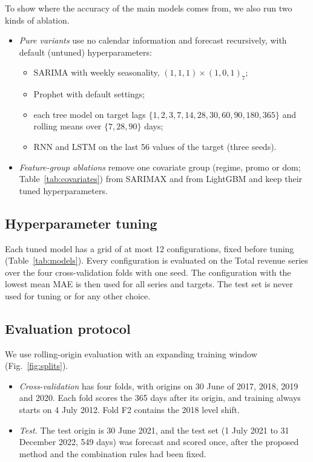 \documentclass[conference]{IEEEtran}
\begin{document}
To show where the accuracy of the main models comes from, we also run two kinds of ablation.
\begin{itemize}
\item \emph{Pure variants} use no calendar information and forecast recursively, with default (untuned) hyperparameters:
\begin{itemize}
\item SARIMA with weekly seasonality, $(1,1,1)\times(1,0,1)_7$;
\item Prophet with default settings;
\item each tree model on target lags $\{1,2,3,7,14,28,30,60,90,180,365\}$ and rolling means over $\{7,28,90\}$ days;
\item RNN and LSTM on the last 56 values of the target (three seeds).
\end{itemize}
\item \emph{Feature-group ablations} remove one covariate group (regime, promo or dom; Table~\ref{tab:covariates}) from SARIMAX and from LightGBM and keep their tuned hyperparameters.
\end{itemize}

\subsection{Hyperparameter tuning}
Each tuned model has a grid of at most 12 configurations, fixed before tuning (Table~\ref{tab:models}).
Every configuration is evaluated on the Total revenue series over the four cross-validation folds with one seed.
The configuration with the lowest mean MAE is then used for all series and targets.
The test set is never used for tuning or for any other choice.

\subsection{Evaluation protocol}
We use rolling-origin evaluation with an expanding training window~\cite{tashman2000outofsample,bergmeir2018cv} (Fig.~\ref{fig:splits}).
\begin{itemize}
\item \emph{Cross-validation} has four folds, with origins on 30 June of 2017, 2018, 2019 and 2020. Each fold scores the 365 days after its origin, and training always starts on 4 July 2012. Fold F2 contains the 2018 level shift.
\item \emph{Test.} The test origin is 30 June 2021, and the test set (1 July 2021 to 31 December 2022, 549 days) was forecast and scored once, after the proposed method and the combination rules had been fixed.
\end{itemize}
\end{document}

